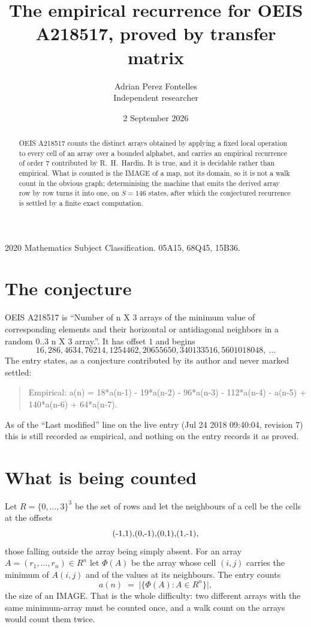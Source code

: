 \documentclass[11pt,a4paper]{article}
\title{The empirical recurrence for OEIS A218517, proved by transfer matrix}
\author{Adrian Perez Fontelles\\ \small Independent researcher}
\date{2 September 2026}
\theoremstyle{plain}
\theoremstyle{definition}
\begin{document}
\maketitle

\begin{abstract}
OEIS A218517 counts the distinct arrays obtained by applying a fixed local operation to every cell
of an array over a bounded alphabet, and carries an empirical recurrence of order $7$
contributed by R.~H.~Hardin. It is true, and it is decidable rather than empirical. What is
counted is the IMAGE of a map, not its domain, so it is not a walk count in the obvious graph;
determinising the machine that emits the derived array row by row turns it into one, on
$S=146$ states, after which the conjectured recurrence is settled by a finite exact
computation.
\end{abstract}

\noindent\small 2020 Mathematics Subject Classification. 05A15, 68Q45, 15B36.\normalsize

\section{The conjecture}

OEIS A218517 is ``Number of n X 3 arrays of the minimum value of corresponding elements and their horizontal or antidiagonal neighbors in a random 0..3 n X 3 array.''. It has offset $1$ and begins
\[
16, 286, 4634, 76214, 1254462, 20655650, 340133516, 5601018048,\ \dots
\]
The entry states, as a conjecture contributed by its author and never marked settled:
\begin{quote}
Empirical: a(n) = 18*a(n-1) - 19*a(n-2) - 96*a(n-3) - 112*a(n-4) - a(n-5) + 140*a(n-6) + 64*a(n-7).
\end{quote}
As of the ``Last modified'' line on the live entry (Jul 24 2018 09:40:04, revision 7) this is still
recorded as empirical, and nothing on the entry records it as proved.

\section{What is being counted}

Let $R=\{0,\dots,3\}^{3}$ be the set of rows and let the neighbours of
a cell be the cells at the offsets
\[
$(-1,1)$, $(0,-1)$, $(0,1)$, $(1,-1)$,
\]
those falling outside the array being simply absent. For an array
$A=(r_1,\dots,r_n)\in R^n$ let $\Phi(A)$ be the array whose cell $(i,j)$ carries the
minimum of $A(i,j)$ and of the values at its neighbours. The entry counts
\[
a(n)\;=\;\bigl|\{\Phi(A):A\in R^n\}\bigr| ,
\]
the size of an IMAGE. That is the whole difficulty: two different arrays with the same
minimum-array must be counted once, and a walk count on the arrays would count them twice.
\end{document}
